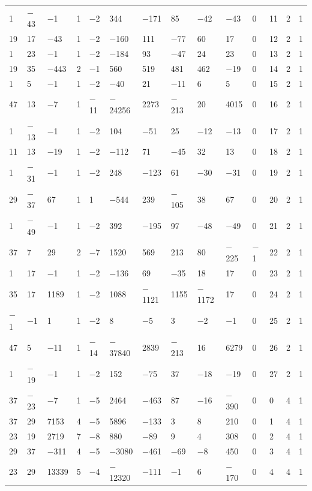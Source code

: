 \documentclass[pdftex]{sigma}
\numberwithin{equation}{section}
\theoremstyle{definition}
\numberwithin{table}{section}
\begin{document}
{\begin{paracol}{3}
\begin{supertabular}{|w{c}{.32cm}w{c}{.32cm}w{c}{.32cm}@{\hspace{.5cm}}w{c}{.2cm}w{c}{.2cm}|@{\hspace{\tabcolsep}}HHHHHHw{c}{.17cm}w{c}{.17cm}w{c}{.17cm}|}
			1 & $-$43 & $-$1 & 1 & $-$2 & 344 & $-$171 & 85 & $-$42 & $-$43 & 0 & 11 & 2 & 1 \\
			19 & 17 & $-$43 & 1 & $-$2 & $-$160 & 111 & $-$77 & 60 & 17 & 0 & 12 & 2 & 1 \\
			1 & 23 & $-$1 & 1 & $-$2 & $-$184 & 93 & $-$47 & 24 & 23 & 0 & 13 & 2 & 1 \\
			19 & 35 & $-$443 & 2 & $-$1 & 560 & 519 & 481 & 462 & $-$19 & 0 & 14 & 2 & 1 \\
			1 & 5 & $-$1 & 1 & $-$2 & $-$40 & 21 & $-$11 & 6 & 5 & 0 & 15 & 2 & 1 \\
			47 & 13 & $-$7 & 1 & $-$11 & $-$24256 & 2273 & $-$213 & 20 & 4015 & 0 & 16 & 2 & 1 \\
			1 & $-$13 & $-$1 & 1 & $-$2 & 104 & $-$51 & 25 & $-$12 & $-$13 & 0 & 17 & 2 & 1 \\
			11 & 13 & $-$19 & 1 & $-$2 & $-$112 & 71 & $-$45 & 32 & 13 & 0 & 18 & 2 & 1 \\
			1 & $-$31 & $-$1 & 1 & $-$2 & 248 & $-$123 & 61 & $-$30 & $-$31 & 0 & 19 & 2 & 1 \\
			29 & $-$37 & 67 & 1 & 1 & $-$544 & 239 & $-$105 & 38 & 67 & 0 & 20 & 2 & 1 \\
			1 & $-$49 & $-$1 & 1 & $-$2 & 392 & $-$195 & 97 & $-$48 & $-$49 & 0 & 21 & 2 & 1 \\
			37 & 7 & 29 & 2 & $-$7 & 1520 & 569 & 213 & 80 & $-$225 & $-$1 & 22 & 2 & 1 \\
			1 & 17 & $-$1 & 1 & $-$2 & $-$136 & 69 & $-$35 & 18 & 17 & 0 & 23 & 2 & 1 \\
			35 & 17 & 1189 & 1 & $-$2 & 1088 & $-$1121 & 1155 & $-$1172 & 17 & 0 & 24 & 2 & 1 \\
			$-$1 & $-$1 & 1 & 1 & $-$2 & 8 & $-$5 & 3 & $-$2 & $-$1 & 0 & 25 & 2 & 1 \\
			47 & 5 & $-$11 & 1 & $-$14 & $-$37840 & 2839 & $-$213 & 16 & 6279 & 0 & 26 & 2 & 1 \\
			1 & $-$19 & $-$1 & 1 & $-$2 & 152 & $-$75 & 37 & $-$18 & $-$19 & 0 & 27 & 2 & 1 \\
			37 & $-$23 & $-$7 & 1 & $-$5 & 2464 & $-$463 & 87 & $-$16 & $-$390 & 0 & 0 & 4 & 1 \\
			37 & 29 & 7153 & 4 & $-$5 & 5896 & $-$133 & 3 & 8 & 210 & 0 & 1 & 4 & 1 \\
			23 & 19 & 2719 & 7 & $-$8 & 880 & $-$89 & 9 & 4 & 308 & 0 & 2 & 4 & 1 \\
			29 & 37 & $-$311 & 4 & $-$5 & $-$3080 & $-$461 & $-$69 & $-$8 & 450 & 0 & 3 & 4 & 1 \\
			23 & 29 & 13339 & 5 & $-$4 & $-$12320 & $-$111 & $-$1 & 6 & $-$170 & 0 & 4 & 4 & 1 \\

\end{supertabular}
\end{paracol}}
\end{document}

